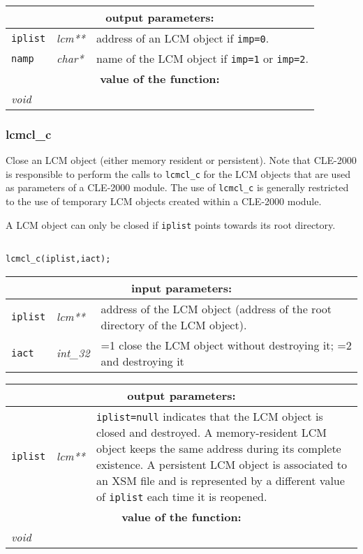 \vskip 0.8cm

\noindent
\begin{tabular}{|p{1.5cm}|p{2cm}|p{11cm}|}
\hline
\multicolumn{3}{|c|}{\bf output parameters:} \\
\hline
{\tt iplist} & {\it lcm**} & address of an LCM object if {\tt imp=0}. \\
\hline
{\tt namp} & {\it char*} & name of the LCM object if {\tt imp=1} or {\tt imp=2}. \\
\hline
\multicolumn{3}{|c|}{\bf value of the function:} \\
\hline
\multicolumn{2}{|l|}{\it void} &  \\
\hline
\end{tabular}

\subsubsection{lcmcl\_c}

Close an LCM object (either memory resident or persistent). Note that CLE-2000 is responsible to perform the calls to
{\tt lcmcl\_c} for the LCM objects that are used as parameters of a CLE-2000 module. The use
of {\tt lcmcl\_c} is generally restricted to the use of temporary LCM objects created within a CLE-2000 module.

\vskip 0.2cm

A LCM object can only be closed if {\tt iplist} points towards its root directory.

\begin{verbatim}

lcmcl_c(iplist,iact);
\end{verbatim}

\noindent
\begin{tabular}{|p{1.5cm}|p{2cm}|p{11cm}|}
\hline
\multicolumn{3}{|c|}{\bf input parameters:} \\
\hline
{\tt iplist} & {\it lcm**} & address of the LCM object (address of the root directory of the LCM object). \\
\hline
{\tt iact} & {\it int\_32} & =1 close the LCM object without destroying it; =2 and destroying it \\
\hline
\end{tabular}

\vskip 0.8cm

\noindent
\begin{tabular}{|p{1.5cm}|p{2cm}|p{11cm}|}
\hline
\multicolumn{3}{|c|}{\bf output parameters:} \\
\hline
{\tt iplist} & {\it lcm**} & {\tt iplist=null} indicates that the LCM object is closed and destroyed. A memory-resident LCM object keeps the
same address during its complete existence. A persistent LCM object is associated to an XSM file and is represented by a different
value of {\tt iplist} each time it is reopened. \\
\hline
\multicolumn{3}{|c|}{\bf value of the function:} \\
\hline
\multicolumn{2}{|l|}{\it void} &  \\
\hline
\end{tabular}

